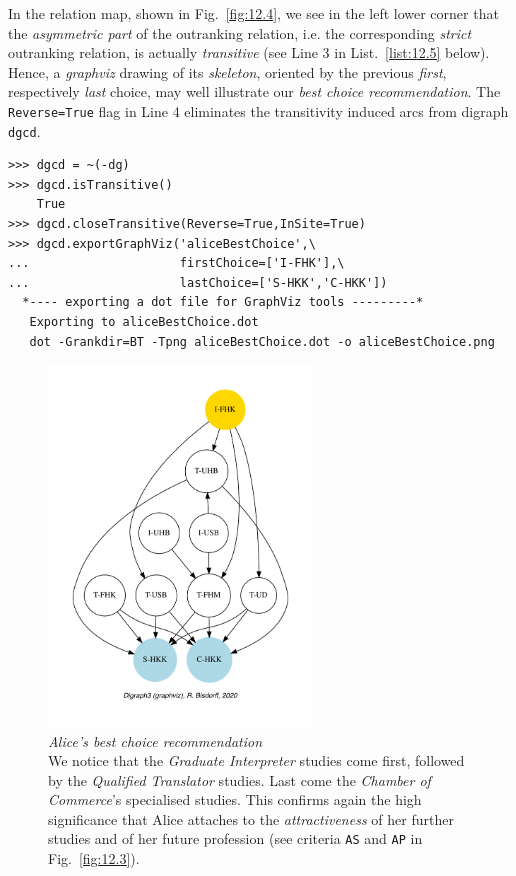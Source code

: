 In the relation map, shown in Fig.~\vref{fig:12.4}, we see in the left lower corner that the \emph{asymmetric part} of the outranking relation, i.e. the corresponding \emph{strict} outranking relation, is actually \emph{transitive} (see Line 3 in List.~\vref{list:12.5} below). Hence, a \emph{graphviz} drawing of its \emph{skeleton}, oriented by the previous \emph{first}, respectively \emph{last} choice, may well illustrate our \emph{best choice recommendation}. The \texttt{Reverse=True} flag in Line 4 eliminates the transitivity induced arcs from digraph \texttt{dgcd}.
\begin{lstlisting}[caption={Alice's strict best choice recommendation},label=list:12.5]
>>> dgcd = ~(-dg)
>>> dgcd.isTransitive()
    True
>>> dgcd.closeTransitive(Reverse=True,InSite=True)
>>> dgcd.exportGraphViz('aliceBestChoice',\
...                     firstChoice=['I-FHK'],\
...                     lastChoice=['S-HKK','C-HKK'])
  *---- exporting a dot file for GraphViz tools ---------*
   Exporting to aliceBestChoice.dot
   dot -Grankdir=BT -Tpng aliceBestChoice.dot -o aliceBestChoice.png
\end{lstlisting}
\begin{figure}[ht]
\sidecaption[t]
\includegraphics[width=7cm]{Figures/12-5-aliceBestChoice.pdf}
\caption[Alice's best choice recommendation]{\emph{Alice's best choice recommendation}\\ We notice that the \emph{Graduate Interpreter} studies come first, followed by the \emph{Qualified Translator} studies. Last come the \emph{Chamber of Commerce}'s specialised studies. This confirms again the high significance that Alice attaches to the \emph{attractiveness} of her further studies and of her future profession (see criteria \texttt{AS} and \texttt{AP} in Fig.~\vref{fig:12.3}).}
\label{fig:12.5}       %
\end{figure}

